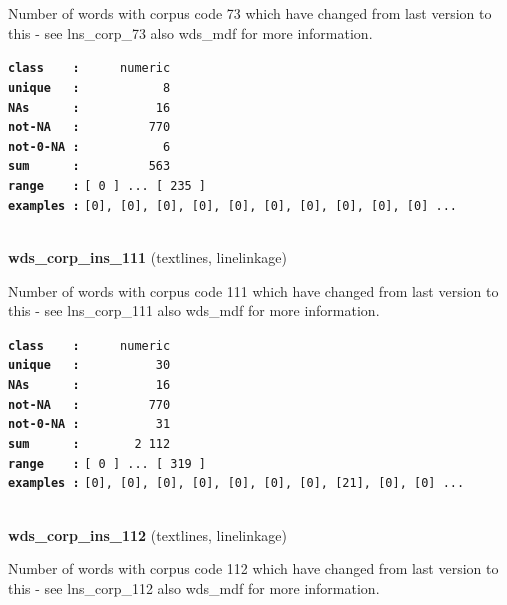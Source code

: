\documentclass[]{article}
\begin{document}
Number of words with corpus code 73 which have changed from last version
to this - see lns\_corp\_73 also wds\_mdf for more information.

\textbf{\texttt{class\ \ \ \ :}} \texttt{~~~~~numeric}\\
\textbf{\texttt{unique\ \ \ :}} \texttt{~~~~~~~~~~~8}\\
\textbf{\texttt{NAs\ \ \ \ \ \ :}} \texttt{~~~~~~~~~~16}\\
\textbf{\texttt{not-NA\ \ \ :}} \texttt{~~~~~~~~~770}\\
\textbf{\texttt{not-0-NA\ :}} \texttt{~~~~~~~~~~~6}\\
\textbf{\texttt{sum\ \ \ \ \ \ :}} \texttt{~~~~~~~~~563}\\
\textbf{\texttt{range\ \ \ \ :}}
\texttt{{[}\ 0\ {]}\ ...\ {[}\ 235\ {]}}\\
\textbf{\texttt{examples\ :}}
\texttt{{[}0{]},\ {[}0{]},\ {[}0{]},\ {[}0{]},\ {[}0{]},\ {[}0{]},\ {[}0{]},\ {[}0{]},\ {[}0{]},\ {[}0{]}\ ...}\\

~

\textbf{wds\_corp\_ins\_111} (textlines, linelinkage)

Number of words with corpus code 111 which have changed from last
version to this - see lns\_corp\_111 also wds\_mdf for more information.

\textbf{\texttt{class\ \ \ \ :}} \texttt{~~~~~numeric}\\
\textbf{\texttt{unique\ \ \ :}} \texttt{~~~~~~~~~~30}\\
\textbf{\texttt{NAs\ \ \ \ \ \ :}} \texttt{~~~~~~~~~~16}\\
\textbf{\texttt{not-NA\ \ \ :}} \texttt{~~~~~~~~~770}\\
\textbf{\texttt{not-0-NA\ :}} \texttt{~~~~~~~~~~31}\\
\textbf{\texttt{sum\ \ \ \ \ \ :}} \texttt{~~~~~~~2~112}\\
\textbf{\texttt{range\ \ \ \ :}}
\texttt{{[}\ 0\ {]}\ ...\ {[}\ 319\ {]}}\\
\textbf{\texttt{examples\ :}}
\texttt{{[}0{]},\ {[}0{]},\ {[}0{]},\ {[}0{]},\ {[}0{]},\ {[}0{]},\ {[}0{]},\ {[}21{]},\ {[}0{]},\ {[}0{]}\ ...}\\

~

\textbf{wds\_corp\_ins\_112} (textlines, linelinkage)

Number of words with corpus code 112 which have changed from last
version to this - see lns\_corp\_112 also wds\_mdf for more information.
\end{document}
